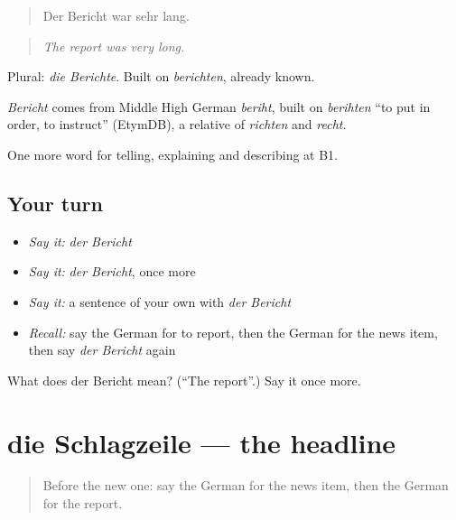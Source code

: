 \begin{quote}
Der Bericht war sehr lang.
\end{quote}

\begin{quote}
\emph{The report was very long.}
\end{quote}

Plural: \emph{die Berichte}. Built on \emph{berichten}, already known.

\begin{cousinweb}
\emph{Bericht} comes from Middle High German \emph{beriht}, built on \emph{berihten} \textquotedblleft{}to put in order, to instruct\textquotedblright{} (EtymDB), a relative of \emph{richten} and \emph{recht}.
\end{cousinweb}

\begin{grammarlens}[title={What you've built}]
One more word for telling, explaining and describing at B1.
\end{grammarlens}

\subsection*{Your turn}
\begin{itemize}
\raggedright
  \item \emph{Say it:} \emph{der Bericht}
  \item \emph{Say it:} \emph{der Bericht}, once more
  \item \emph{Say it:} a sentence of your own with \emph{der Bericht}
  \item \emph{Recall:} say the German for to report, then the German for the news item, then say \emph{der Bericht} again
\end{itemize}

\begin{tcolorbox}[breakable,colback=teal!4,colframe=teal!35!black,title={Before you move on}]
What does der Bericht mean? (\textquotedblleft{}The report\textquotedblright{}.) Say it once more.
\end{tcolorbox}
\section[die Schlagzeile]{die Schlagzeile — the headline}

\label{lesson:GE-C271-schlagzeile}



\begin{quote}
Before the new one: say the German for the news item, then the German for the report.
\end{quote}

